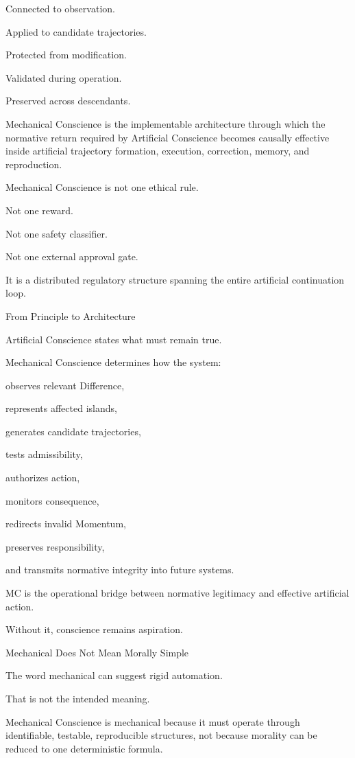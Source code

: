 Connected to observation.

Applied to candidate trajectories.

Protected from modification.

Validated during operation.

Preserved across descendants.

Mechanical Conscience is the implementable architecture through which the normative return required by Artificial Conscience becomes causally effective inside artificial trajectory formation, execution, correction, memory, and reproduction.

Mechanical Conscience is not one ethical rule.

Not one reward.

Not one safety classifier.

Not one external approval gate.

It is a distributed regulatory structure spanning the entire artificial continuation loop.

From Principle to Architecture

Artificial Conscience states what must remain true.

Mechanical Conscience determines how the system:

observes relevant Difference,

represents affected islands,

generates candidate trajectories,

tests admissibility,

authorizes action,

monitors consequence,

redirects invalid Momentum,

preserves responsibility,

and transmits normative integrity into future systems.

MC is the operational bridge between normative legitimacy and effective artificial action.

Without it, conscience remains aspiration.

Mechanical Does Not Mean Morally Simple

The word mechanical can suggest rigid automation.

That is not the intended meaning.

Mechanical Conscience is mechanical because it must operate through identifiable, testable, reproducible structures, not because morality can be reduced to one deterministic formula.

